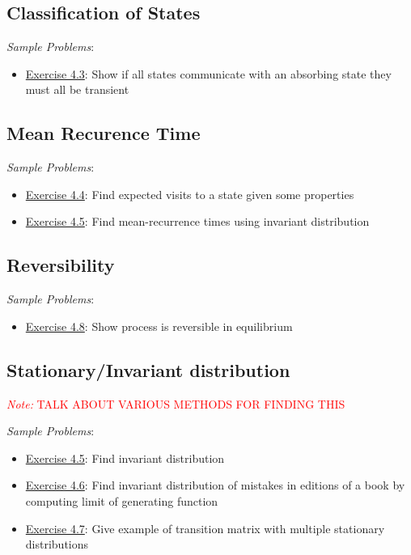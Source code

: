 \documentclass[12pt]{article}
\newcommand{\note}[1]{\textcolor{red}{\textit{Note:} #1}}
\begin{document}
\subsection{Classification of States}


\textit{Sample Problems}: 
\begin{itemize}[nolistsep]
    \item \hyperref[Exercise 4.3]{Exercise 4.3}: Show if all states communicate with an absorbing state they must all be transient
\end{itemize}

\subsection{Mean Recurence Time}

\textit{Sample Problems}: 
\begin{itemize}[nolistsep]
    \item \hyperref[Exercise 4.4]{Exercise 4.4}: Find expected visits to a state given some properties
    \item \hyperref[Exercise 4.5]{Exercise 4.5}: Find mean-recurrence times using invariant distribution
\end{itemize}

\subsection{Reversibility}
\textit{Sample Problems}: 
\begin{itemize}[nolistsep]
    \item \hyperref[Exercise 4.8]{Exercise 4.8}: Show process is reversible in equilibrium
\end{itemize}


\subsection{Stationary/Invariant distribution}

\note{TALK ABOUT VARIOUS METHODS FOR FINDING THIS}

\textit{Sample Problems}: 
\begin{itemize}[nolistsep]
    \item \hyperref[Exercise 4.5]{Exercise 4.5}: Find invariant distribution
    \item \hyperref[Exercise 4.6]{Exercise 4.6}: Find invariant distribution of mistakes in editions of a book by computing limit of generating function
    \item \hyperref[Exercise 4.7]{Exercise 4.7}: Give example of transition matrix with multiple stationary distributions
\end{itemize}
\end{document}
